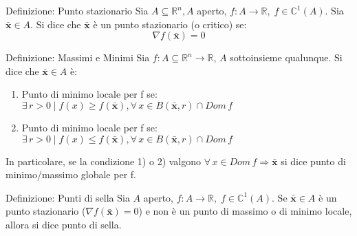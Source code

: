 \documentclass[x11names]{article}
\begin{document}
	\begin{center}
		\colorbox{myblue}{\begin{minipage}{5.75in}
				\begin{blues}{Definizione: Punto stazionario}
					Sia $A \subseteq\mathbb{R}^n, A$ aperto, $f:A\to\mathbb{R}, \;f\in\mathbb{C}^1(A).$ Sia $\boldsymbol{\bar{x}}\in A$. Si dice che $\boldsymbol{\bar{x}}$ è un punto stazionario (o critico) se: 
					\[\nabla f(\boldsymbol{\bar{x}})=0\]
				\end{blues}
		\end{minipage}}       
	\end{center}
	
	\begin{center}
		\colorbox{myblue}{\begin{minipage}{5.75in}
				\begin{blues}{Definizione: Massimi e Minimi}
					Sia $f:A\subseteq\mathbb{R}^n\to \mathbb{R}$, $A$ sottoinsieme qualunque. Si dice che $\boldsymbol{\bar{x}}\in A$ è: 
					\begin{enumerate}
						\item Punto di minimo locale per f se: $\exists\, r>0\;|\;f(x)\geq f(\boldsymbol{\bar{x}}), \forall\,x\in B(\boldsymbol{\bar{x}},r) \cap Dom\,f$
						\item  Punto di minimo locale per f se: $\exists\, r>0\;|\;f(x)\leq f(\boldsymbol{\bar{x}}), \forall\,x\in B(\boldsymbol{\bar{x}},r) \cap Dom\,f$
					\end{enumerate}
					In particolare, se la condizione 1) o 2) valgono $\forall\,x\in Dom\,f \Longrightarrow \boldsymbol{\bar{x}}$ si dice punto di minimo/massimo globale per f. 
				\end{blues}
		\end{minipage}}       
	\end{center}
	
	\begin{center}
		\colorbox{myblue}{\begin{minipage}{5.75in}
				\begin{blues}{Definizione: Punti di sella}
					Sia $A$ aperto, $f:A\to \mathbb{R},\;f\in\mathbb{C}^1(A)$. Se $\boldsymbol{\bar{x}}\in A$ è un punto stazionario ($\nabla f(\boldsymbol{\bar{x}})=0$) e non è un punto di massimo o di minimo locale, allora si dice punto di sella. 
				\end{blues}
		\end{minipage}}       
	\end{center}
	
\end{document}
